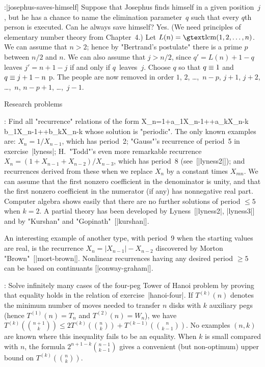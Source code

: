 \ex:\exref|josephus-saves-himself|%
Suppose that Josephus finds himself in a given position~$j$,
but he has a chance to name the elimination parameter~$q$ such that every
$q$th person is executed. Can he always save himself?
\answer Yes. (We need principles of elementary number theory from
Chapter~4.) Let $L(n)=\lcm(1,2,\ldots,n)$. We can assume that
$n>2$; hence by "Bertrand's postulate" there is a prime $p$ between
$n/2$ and $n$. We can also assume that $j>n/2$, since $q'=L(n)+1-q$
leaves $j'=n+1-j$ if and only if $q$~leaves~$j$.
Choose $q$ so that $q\=1$  and $q\=j+1-n$ \tmod p. The
people are now removed in order $1$, $2$, \dots,~$n-p$, $j+1$, $j+2$,
\dots,~$n$, $n-p+1$, \dots,~$j-1$.

\subhead Research problems

\ex: Find all "recurrence" relations of the form
\begindisplay
X_n={1+a_1X_{n-1}+\cdots+a_kX_{n-k}\over
	b_1X_{n-1}+\cdots+b_kX_{n-k}}
\enddisplay
whose solution is "periodic".
\answer The only known examples are:
$X_n=1/X_{n-1}$, which has period~2; "Gauss"'s
recurrence of period~5 in exercise~|lyness|;
H.~"Todd"'s even more remarkable recurrence $X_n=(1+X_{n-1}+X_{n-2})/X_{n-3}$,
which has period~8 (see~[|lyness2|]); and recurrences derived from these
when we replace $X_n$ by a constant times $X_{mn}$.
We can assume that the first nonzero coefficient in the denominator is unity,
and that the first nonzero coefficient in the numerator (if any) has
nonnegative real part. Computer algebra shows easily that there are
no further solutions of period $\le5$ when $k=2$.
 A partial theory
has been developed by Lyness~[|lyness2|, |lyness3|] and by
 "Kurshan" and "Gopinath"~[|kurshan|].\par
An interesting
example of another type, with period~9 when the starting values are
real, is the recurrence $X_n=\vert X_{n-1}\vert-X_{n-2}$ discovered by
Morton "Brown"~[|mort-brown|].
Nonlinear recurrences having any desired period $\ge5$ can be
based on continuants [|conway-graham|].

\ex:
Solve infinitely many cases of the four-peg Tower of Hanoi problem
by proving that equality holds in the relation of exercise~|hanoi-four|.
\answer If $T^{(k)}(n)$ denotes the minimum number of moves needed to transfer
$n$ disks with $k$ auxiliary pegs (hence $T^{(1)}(n)=T_n$
and $T^{(2)}(n)=W_n$), we have $T^{(k)}({n+1\choose k})\le
2T^{(k)}({n\choose k})+T^{(k-1)}({n\choose k-1})$. No examples
$(n,k)$ are known where this inequality fails to be an equality.
When $k$ is small compared with $n$, the formula $2^{n+1-k}{n-1\choose k-1}$
gives a convenient (but non-optimum) upper bound on $T^{(k)}({n\choose k})$.

